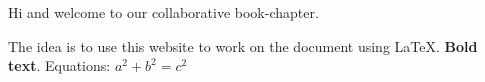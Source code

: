 Hi and welcome to our collaborative book-chapter.  

The idea is to use this website to work on the document using \LaTeX.  \textbf{Bold text}. Equations: $a^2+b^2=c^2$